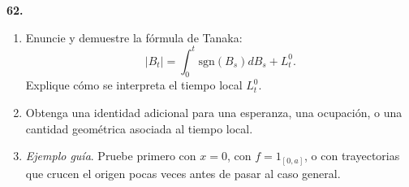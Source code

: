 \documentclass[11pt, letterpaper]{article}
\begin{document}
\begin{ejercicio}
    \textbf{62.} 
    \begin{enumerate}
        \item Enuncie y demuestre la fórmula de Tanaka:
        \[ |B_{t}|=\int_{0}^{t}\text{sgn}(B_{s})dB_{s}+L_{t}^{0}. \]
        Explique cómo se interpreta el tiempo local $L_{t}^{0}$.
        \item Obtenga una identidad adicional para una esperanza, una ocupación, o una cantidad geométrica asociada al tiempo local.
        \item \textit{Ejemplo guía}. Pruebe primero con $x=0$, con $f=1_{[0,a]}$, o con trayectorias que crucen el origen pocas veces antes de pasar al caso general.
    \end{enumerate}
\end{ejercicio}

\vspace{5mm}
\end{document}
